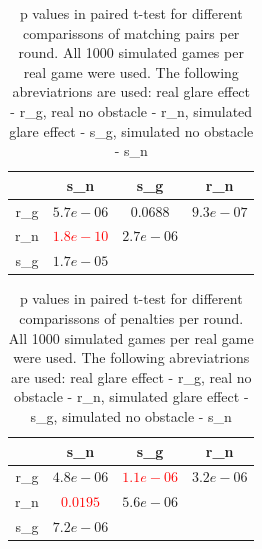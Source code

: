 \begin{table}[H]
	\centering
	\caption{p values in paired t-test for different comparissons of matching pairs per round. All 1000 simulated games per real game were used. The following abreviatrions are used: real glare effect - r\_g, real no obstacle - r\_n, simulated glare effect - s\_g, simulated no obstacle - s\_n}%
	\begin{tabular}{|c|c|c|c|}
		\hline
		 		& s\_n  	&  s\_g  & r\_n 		\\
		\hline
		 r\_g 	&$5.7e-06$&\textcolor{mygreen}{$0.0688$}&$9.3e-07$			\\
		 r\_n 	&\textcolor{red}{$1.8e-10$}&$2.7e-06$&		  			\\
		 s\_g 	&$1.7e-05$&			&		  			\\
		\hline
	\end{tabular}
\end{table}

\begin{table}[H]
	\centering
	\caption{p values in paired t-test for different comparissons of penalties per round. All 1000 simulated games per real game were used. The following abreviatrions are used: real glare effect - r\_g, real no obstacle - r\_n, simulated glare effect - s\_g, simulated no obstacle - s\_n}%
	\begin{tabular}{|c|c|c|c|}
		\hline
				& s\_n  	&  s\_g  & r\_n 		\\
		\hline
		r\_g 	&$4.8e-06$&\textcolor{red}{$1.1e-06$}&$3.2e-06$			\\
		r\_n 	&\textcolor{red}{$0.0195$}&$5.6e-06$&		  			\\
		s\_g 	&$7.2e-06$&			&		  			\\
		\hline
	\end{tabular}
\end{table}

